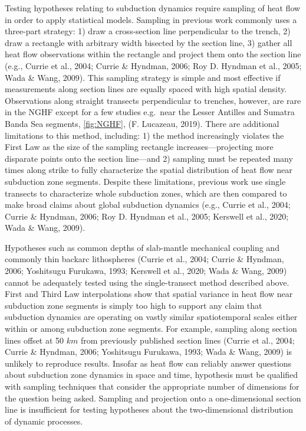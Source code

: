 \documentclass[draft,linenumbers]{agujournal2018}
\begin{document}
Testing hypotheses relating to subduction dynamics require sampling of
heat flow in order to apply statistical models. Sampling in previous
work commonly uses a three-part strategy: 1) draw a cross-section line
perpendicular to the trench, 2) draw a rectangle with arbitrary width
bisected by the section line, 3) gather all heat flow observations
within the rectangle and project them onto the section line (e.g.,
Currie et al., 2004; Currie \& Hyndman, 2006; Roy D. Hyndman et al.,
2005; Wada \& Wang, 2009). This sampling strategy is simple and most
effective if measurements along section lines are equally spaced with
high spatial density. Observations along straight transects
perpendicular to trenches, however, are rare in the NGHF except for a
few studies e.g.~near the Lesser Antilles and Sumatra Banda Sea
segments, \ref{fig:NGHF}, (F. Lucazeau, 2019). There are additional
limitations to this method, including: 1) the method increasingly
violates the First Law as the size of the sampling rectangle
increases---projecting more disparate points onto the section line---and
2) sampling must be repeated many times along strike to fully
characterize the spatial distribution of heat flow near subduction zone
segments. Despite these limitations, previous work use single transects
to characterize whole subduction zones, which are then compared to make
broad claims about global subduction dynamics (e.g., Currie et al.,
2004; Currie \& Hyndman, 2006; Roy D. Hyndman et al., 2005; Kerswell et
al., 2020; Wada \& Wang, 2009).

Hypotheses such as common depths of slab-mantle mechanical coupling and
commonly thin backarc lithospheres (Currie et al., 2004; Currie \&
Hyndman, 2006; Yoshitsugu Furukawa, 1993; Kerswell et al., 2020; Wada \&
Wang, 2009) cannot be adequately tested using the single-transect method
described above. First and Third Law interpolations show that spatial
variance in heat flow near subduction zone segments is simply too high
to support any claim that subduction dynamics are operating on vastly
similar spatiotemporal scales either within or among subduction zone
segments. For example, sampling along section lines offset at 50 \(km\)
from previously published section lines (Currie et al., 2004; Currie \&
Hyndman, 2006; Yoshitsugu Furukawa, 1993; Wada \& Wang, 2009) is
unlikely to reproduce results. Insofar as heat flow can reliably answer
questions about subduction zone dynamics in space and time, hypothesis
must be qualified with sampling techniques that consider the appropriate
number of dimensions for the question being asked. Sampling and
projection onto a one-dimensional section line is insufficient for
testing hypotheses about the two-dimensional distribution of dynamic
processes.
\end{document}
